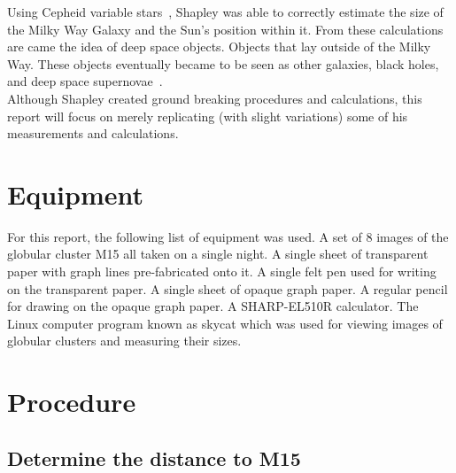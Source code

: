 \documentclass{article}
\begin{document}
Using Cepheid variable stars~\cite{Udalski:1999}, Shapley was able to correctly
estimate the size of the Milky Way Galaxy and the Sun's position within it. From
these calculations are came the idea of deep space objects. Objects that lay
outside of the Milky Way. These objects eventually became to be seen as
other galaxies, black holes, and deep space supernovae~\cite{Fred:40}. \\

Although Shapley created ground breaking procedures and calculations, this
report will focus on merely replicating (with slight variations) some of
his measurements and calculations.


\section{Equipment}

For this report, the following list of equipment was used. A set of 8 images of the globular
cluster M15 all taken on a single night. A single sheet of transparent paper with graph lines
pre-fabricated onto it. A single felt pen used for writing on the transparent paper.
A single sheet of opaque graph paper. A regular pencil for drawing on the opaque 
graph paper. A SHARP-EL510R calculator. The Linux computer program
known as skycat which was used for viewing images of globular clusters and measuring their
sizes.


\section{Procedure}

\subsection{Determine the distance to M15}
\end{document}

